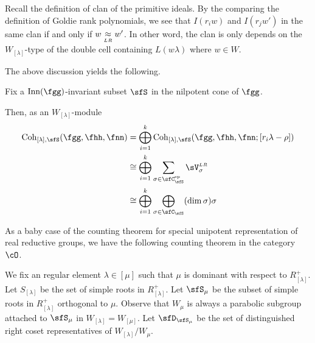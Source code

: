 \documentclass[counting_main.tex]{subfiles}
\begin{document}
Recall the definition of clan of the primitive ideals. By the comparing the
definition of Goldie rank polynomials, we see that $I(r_{i}w)$ and $I(r_{j}w')$
in the same clan if and only if $w\mathrel{\mathop{\approx}\limits_{\scriptscriptstyle LR}} w'$. In other word, the clan is only
depends on the $W_{[\lambda]}$-type of the double cell containing $L(w\lambda)$
where $w\in W$.

\medskip


The above discussion yields
the following.
\begin{lem}\label{lem:C.S}
  Fix a $\Gad$-invariant subset $\sfS$ in the nilpotent cone of $\fgg$.

  Then, as an $W_{[\lambda]}$-module
  \[
    \begin{split}
      \Coh_{[\lambda],\sfS}(\fgg,\fhh,\fnn) &= \bigoplus_{i=1}^{k}
      \Coh_{[\lambda], \sfS}(\fgg,\fhh,\fnn;[r_{i}\lambda-\rho])\\
      & \cong \bigoplus_{i=1}^{k} \sum_{\sigma\in \Csp_{\sfS}} \VLR_{\sigma}\\
      & \cong \bigoplus_{i=1}^{k} \bigoplus_{\sigma\in \sfC_{\sfS}} (\dim \sigma) \sigma
    \end{split}
  \]
\end{lem}

As a baby case of the counting theorem for special unipotent representation of
real reductive groups, we have the following counting theorem in the category
$\cO$.

We fix an regular element $\lambda\in [\mu]$ such that $\mu$ is dominant with
respect to $R^{+}_{[\lambda]}$. Let $S_{[\lambda]}$ be the set of simple roots
in $R^{+}_{[\lambda]}$. Let $\sfS_{\mu}$ be the subset of simple roots in
$R^{+}_{[\lambda]}$ orthogonal to $\mu$. Observe that $W_{\mu}$ is always a
parabolic subgroup attached to $\sfS_{\mu}$ in $W_{[\lambda]} = W_{[\mu]}$. Let
$\sfD_{\sfS_{\mu}}$ be the set of distinguished right coset representatives of
$W_{[\lambda]}/W_{\mu}$. 
\end{document}
